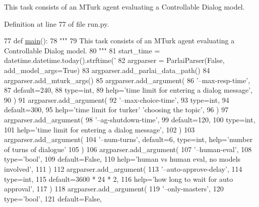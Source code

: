 \begin{DoxyVerb}This task consists of an MTurk agent evaluating a Controllable Dialog model.
\end{DoxyVerb}
 

Definition at line 77 of file run.\+py.


\begin{DoxyCode}
77 \textcolor{keyword}{def }\hyperlink{namespaceprojects_1_1wizard__of__wikipedia_1_1mturk__evaluation__task_1_1run_ad3ab2c71f8083c3112815c0b363d316b}{main}():
78     \textcolor{stringliteral}{"""}
79 \textcolor{stringliteral}{    This task consists of an MTurk agent evaluating a Controllable Dialog model.}
80 \textcolor{stringliteral}{    """}
81     start\_time = datetime.datetime.today().strftime(\textcolor{stringliteral}{'%
82     argparser = ParlaiParser(\textcolor{keyword}{False}, add\_model\_args=\textcolor{keyword}{True})
83     argparser.add\_parlai\_data\_path()
84     argparser.add\_mturk\_args()
85     argparser.add\_argument(
86         \textcolor{stringliteral}{'--max-resp-time'},
87         default=240,
88         type=int,
89         help=\textcolor{stringliteral}{'time limit for entering a dialog message'},
90     )
91     argparser.add\_argument(
92         \textcolor{stringliteral}{'--max-choice-time'},
93         type=int,
94         default=300,
95         help=\textcolor{stringliteral}{'time limit for turker'} \textcolor{stringliteral}{'choosing the topic'},
96     )
97     argparser.add\_argument(
98         \textcolor{stringliteral}{'--ag-shutdown-time'},
99         default=120,
100         type=int,
101         help=\textcolor{stringliteral}{'time limit for entering a dialog message'},
102     )
103     argparser.add\_argument(
104         \textcolor{stringliteral}{'--num-turns'}, default=6, type=int, help=\textcolor{stringliteral}{'number of turns of dialogue'}
105     )
106     argparser.add\_argument(
107         \textcolor{stringliteral}{'--human-eval'},
108         type=\textcolor{stringliteral}{'bool'},
109         default=\textcolor{keyword}{False},
110         help=\textcolor{stringliteral}{'human vs human eval, no models involved'},
111     )
112     argparser.add\_argument(
113         \textcolor{stringliteral}{'--auto-approve-delay'},
114         type=int,
115         default=3600 * 24 * 2,
116         help=\textcolor{stringliteral}{'how long to wait for auto approval'},
117     )
118     argparser.add\_argument(
119         \textcolor{stringliteral}{'--only-masters'},
120         type=\textcolor{stringliteral}{'bool'},
121         default=\textcolor{keyword}{False},
}
\end{DoxyCode}
